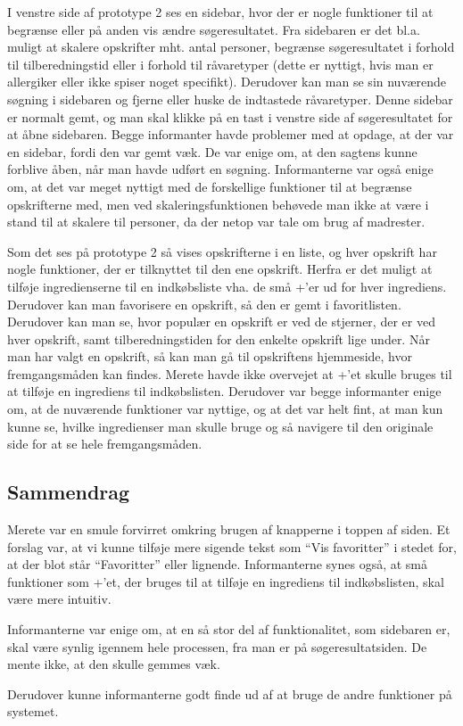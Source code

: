 I venstre side af prototype 2 ses en sidebar, hvor der er nogle funktioner til at begrænse eller på anden vis ændre søgeresultatet. Fra sidebaren er det bl.a. muligt at skalere opskrifter mht. antal personer, begrænse søgeresultatet i forhold til tilberedningstid eller i forhold til råvaretyper (dette er nyttigt, hvis man \fx er allergiker eller ikke spiser noget specifikt). Derudover kan man se sin nuværende søgning i sidebaren og fjerne eller huske de indtastede råvaretyper. Denne sidebar er normalt gemt, og man skal klikke på en tast i venstre side af søgeresultatet for at åbne sidebaren. Begge informanter havde problemer med at opdage, at der var en sidebar, fordi den var gemt væk. De var enige om, at den sagtens kunne forblive åben, når man havde udført en søgning. Informanterne var også enige om, at det var meget nyttigt med de forskellige funktioner til at begrænse opskrifterne med, men \fx ved skaleringsfunktionen behøvede man ikke at være i stand til at skalere til  personer, da der netop var tale om brug af madrester. 

Som det ses på prototype 2 så vises opskrifterne i en liste, og hver opskrift har nogle funktioner, der er tilknyttet til den ene opskrift. Herfra er det muligt at tilføje ingredienserne til en indkøbsliste vha. de små +'er ud for hver ingrediens. Derudover kan man favorisere en opskrift, så den er gemt i favoritlisten. Derudover kan man se, hvor populær en opskrift er ved de stjerner, der er ved hver opskrift, samt tilberedningstiden for den enkelte opskrift lige under. Når man har valgt en opskrift, så kan man gå til opskriftens hjemmeside, hvor fremgangsmåden kan findes. Merete havde ikke overvejet at +'et skulle bruges til at tilføje en ingrediens til indkøbslisten. Derudover var begge informanter enige om, at de nuværende funktioner var nyttige, og at det var helt fint, at man kun kunne se, hvilke ingredienser man skulle bruge og så navigere til den originale side for at se hele fremgangsmåden.

\subsection{Sammendrag}
Merete var en smule forvirret omkring brugen af knapperne i toppen af siden. Et forslag var, at vi kunne tilføje mere sigende tekst som ``Vis favoritter'' i stedet for, at der blot står ``Favoritter'' eller lignende. Informanterne synes også, at små funktioner som +'et, der bruges til at tilføje en ingrediens til indkøbslisten, skal være mere intuitiv.

Informanterne var enige om, at en så stor del af funktionalitet, som sidebaren er, skal være synlig igennem hele processen, fra man er på søgeresultatsiden. De mente ikke, at den skulle gemmes væk.

Derudover kunne informanterne godt finde ud af at bruge de andre funktioner på systemet.